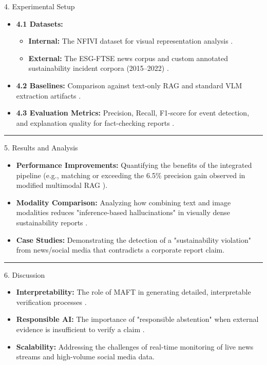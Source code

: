 \documentclass{article}
\begin{document}
4. Experimental Setup
\begin{itemize}
\item 

\textbf{4.1 Datasets:}
\begin{itemize}
\item 

\textbf{Internal:} The NFIVI dataset for visual representation analysis  \parencite{bingjie_li_487d69fd}.\item 

\textbf{External:} The ESG-FTSE news corpus  \parencite{mariya_pavlova_259be499} and custom annotated sustainability incident corpora (2015–2022)  \parencite{abir_naskar_17efeb7b}.
\end{itemize}\item 

\textbf{4.2 Baselines:} Comparison against text-only RAG and standard VLM extraction artifacts  \parencite{lars_wilhelmi_8d7e860b}.\item 

\textbf{4.3 Evaluation Metrics:} Precision, Recall, F1-score for event detection, and explanation quality for fact-checking reports  \parencite[]{kaoukis__georgios_35bab107, kazuya_kakizaki_4193ad80}.
\end{itemize}
\begin{center}\rule{\linewidth}{0.5pt}\end{center}
5. Results and Analysis
\begin{itemize}
\item 

\textbf{Performance Improvements:} Quantifying the benefits of the integrated pipeline (e.g., matching or exceeding the 6.5\% precision gain observed in modified multimodal RAG  \parencite{g_saipooja_m_n_488bfdd6}).\item 

\textbf{Modality Comparison:} Analyzing how combining text and image modalities reduces "inference-based hallucinations" in visually dense sustainability reports  \parencite{lars_wilhelmi_8d7e860b}.\item 

\textbf{Case Studies:} Demonstrating the detection of a "sustainability violation" from news/social media that contradicts a corporate report claim.
\end{itemize}
\begin{center}\rule{\linewidth}{0.5pt}\end{center}
6. Discussion
\begin{itemize}
\item 

\textbf{Interpretability:} The role of MAFT in generating detailed, interpretable verification processes  \parencite{kazuya_kakizaki_4193ad80}.\item 

\textbf{Responsible AI:} The importance of "responsible abstention" when external evidence is insufficient to verify a claim  \parencite{kaoukis__georgios_35bab107}.\item 

\textbf{Scalability:} Addressing the challenges of real-time monitoring of live news streams and high-volume social media data.
\end{itemize}
\end{document}
